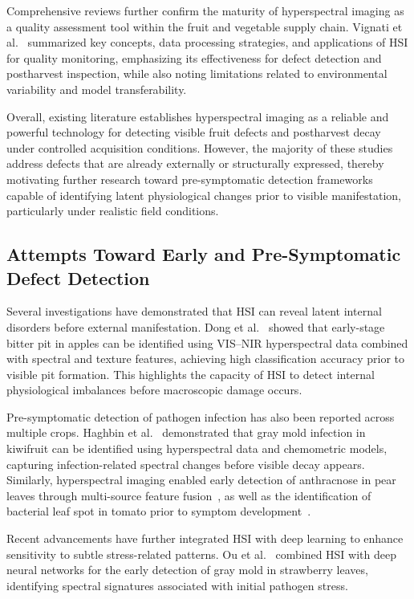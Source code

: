 \medskip
\noindent
Comprehensive reviews further confirm the maturity of hyperspectral imaging as a quality
assessment tool within the fruit and vegetable supply chain. Vignati et al.~\cite{app13179740}
summarized key concepts, data processing strategies, and applications of HSI for quality
monitoring, emphasizing its effectiveness for defect detection and postharvest inspection,
while also noting limitations related to environmental variability and model transferability.

\medskip
\noindent
Overall, existing literature establishes hyperspectral imaging as a reliable and powerful
technology for detecting visible fruit defects and postharvest decay under controlled
acquisition conditions. However, the majority of these studies address defects that are
already externally or structurally expressed, thereby motivating further research toward
pre-symptomatic detection frameworks capable of identifying latent physiological changes
prior to visible manifestation, particularly under realistic field conditions.

\subsection{Attempts Toward Early and Pre-Symptomatic Defect Detection}

\noindent
Several investigations have demonstrated that HSI can reveal latent internal disorders
before external manifestation. Dong et al.~\cite{DONG2025101166} showed that early-stage
bitter pit in apples can be identified using VIS--NIR hyperspectral data combined with
spectral and texture features, achieving high classification accuracy prior to visible pit
formation. This highlights the capacity of HSI to detect internal physiological imbalances
before macroscopic damage occurs.

\medskip
\noindent
Pre-symptomatic detection of pathogen infection has also been reported across multiple
crops. Haghbin et al.~\cite{haghbin2023non} demonstrated that gray mold infection in
kiwifruit can be identified using hyperspectral data and chemometric models, capturing
infection-related spectral changes before visible decay appears. Similarly, hyperspectral
imaging enabled early detection of anthracnose in pear leaves through multi-source feature
fusion~\cite{zhang2024early}, as well as the identification of bacterial leaf spot in tomato
prior to symptom development~\cite{zhang2024hyperspectral}.

\medskip
\noindent
Recent advancements have further integrated HSI with deep learning to enhance sensitivity
to subtle stress-related patterns. Ou et al.~\cite{ou2024hyperspectral} combined HSI with
deep neural networks for the early detection of gray mold in strawberry leaves, identifying
spectral signatures associated with initial pathogen stress.

